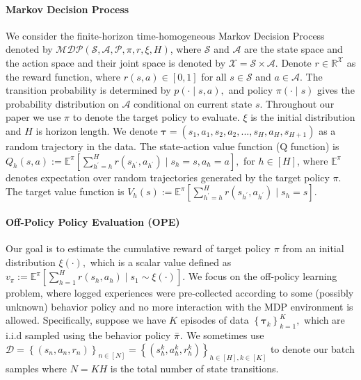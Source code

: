 \documentclass{article}
\numberwithin{equation}{section}
\theoremstyle{plain}
\theoremstyle{definition}
\theoremstyle{remark}
\begin{document}
\paragraph{Markov Decision Process} We consider the finite-horizon time-homogeneous Markov Decision Process denoted by $\mathcal{MDP}\left(\mathcal{S},\mathcal{A},\mathcal{P},\pi,r,\xi,H\right)$, where $\mathcal{S}$ and $\mathcal{A}$ are the state space and the action space and their joint space is denoted by $\mathcal{X} = \mathcal{S} \times \mathcal{A}.$ Denote $r \in \mathbb{R}^{\mathcal{X}}$ as the reward function, where $r(s,a)\in[0,1]$ for all $s\in \mathcal{S}$ and $a \in \mathcal{A}$. The transition probability is determined by $p\left(\cdot \mid s,a\right),$ and policy $\pi(\cdot \mid s)$ gives the probability distribution on $\mathcal{A}$ conditional on current state $s$. Throughout our paper we use $\pi$ to denote the target policy to evaluate. $\xi$ is the initial distribution and $H$ is horizon length. We denote $\boldsymbol{\tau} = (s_1,a_1,s_2,a_2,...,s_H,a_H,s_{H+1})$ as a random trajectory in the data. The state-action value function (Q function) is $Q_h(s,a) := \mathbb{E}^{\pi} \left[\sum_{h^{\prime} = h}^H r(s_{h^{\prime}},a_{h^{\prime}}) \mid s_h = s, a_h = a\right],$ for $h \in [H]$, where $\mathbb{E}^{\pi}$ denotes expectation over random trajectories generated by the target policy $\pi.$ The target value function is $V_h(s) := \mathbb{E}^{\pi} \left[\sum_{h^{\prime} = h}^H r(s_{h^{\prime}},a_{h^{\prime}}) \mid s_h = s\right].$

\paragraph{Off-Policy Policy Evaluation (OPE)} Our goal is to estimate the cumulative reward of target policy $\pi$ from an initial distribution $\xi(\cdot),$ which is a scalar value defined as $v_{\pi} := \mathbb{E}^{\pi} \left[\sum_{h=1}^H r(s_{h},a_{h}) \mid s_1 \sim \xi(\cdot)\right].$ We focus on the off-policy learning problem, where logged experiences were pre-collected according to some (possibly unknown) behavior policy and no more interaction with the MDP environment is allowed. Specifically, suppose we have $K$ episodes of data $\left\{\boldsymbol{\tau}_k\right\}_{k=1}^K,$ which are i.i.d sampled using the behavior policy $\Bar{\pi}.$ We sometimes use $\mathcal{D}=\left\{\left(s_{n}, a_{n}, r_{n}\right)\right\}_{n \in[N]} = \left\{\left(s_{h}^k, a_{h}^k, r_{h}^k\right)\right\}_{h \in[H], k \in [K]}$ to denote our batch samples where $N = KH$ is the total number of state transitions.
\end{document}
